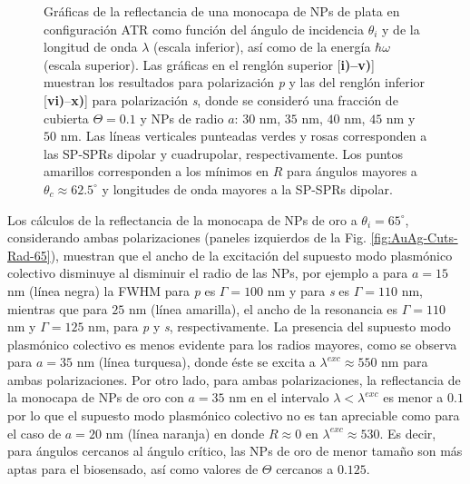\begin{figure}[h!]
\vspace*{-.5em}
	\caption{Gráficas de la reflectancia de una monocapa de NPs de plata en configuración ATR como función del ángulo de incidencia $\theta_i$ y de la longitud de onda $\lambda$ (escala inferior), así como de la energía  $\hbar\omega$ (escala superior).  Las gráficas   en el renglón superior [\textbf{i)--v)}] muestran los resultados para  polarización \emph{p} y las del renglón inferior  [\textbf{vi)}--\textbf{x)}]  para polarización  \emph{s}, donde se consideró una fracción de cubierta $\Theta = 0.1$ y  NPs de radio  $a$: $30$ nm, $35$ nm, $40$ nm, $45$ nm y $50$ nm.  Las líneas verticales punteadas verdes y rosas corresponden a las SP-SPRs dipolar y  cuadrupolar, respectivamente.  Los puntos amarillos corresponden a los mínimos en $R$ para ángulos mayores a $\theta_c\approx 62.5^\circ$ y longitudes de onda mayores a la SP-SPRs dipolar.
}	\label{fig:Ag-R-Rad}	
	\end{figure}	

Los cálculos de la reflectancia de la monocapa de NPs de oro a $\theta_i=65^\circ$, considerando ambas polarizaciones (paneles izquierdos de la Fig. \ref{fig:AuAg-Cuts-Rad-65}), muestran que el ancho de la excitación del supuesto modo plasmónico colectivo disminuye  al disminuir el radio de las NPs, por ejemplo a para $a=15$ nm (línea negra) la FWHM para \emph{p} es $\Gamma=100$ nm y para \emph{s} es $\Gamma=110$ nm, mientras que para $25$ nm (línea amarilla), el ancho de la resonancia es $\Gamma=110$ nm y $\Gamma=125$  nm, para \emph{p} y \emph{s}, respectivamente. La presencia del supuesto modo plasmónico colectivo es menos evidente para los radios mayores, como se observa para $a=35$ nm (línea turquesa), donde éste se excita a $\lambda^{exc}\approx 550$ nm para ambas polarizaciones. Por otro lado, para ambas polarizaciones, la reflectancia de la monocapa de NPs de oro con $a=35$ nm en el intervalo  $\lambda<\lambda^{exc}$  es menor a $0.1$ por lo que el supuesto modo plasmónico colectivo no es tan apreciable como para el caso de $a=20$ nm (línea naranja) en donde $R\approx 0$ en $\lambda^{exc}\approx 530$. Es decir, para ángulos cercanos al ángulo crítico, las NPs de oro de menor tamaño son más aptas para el biosensado, así como valores de $\Theta$ cercanos a $0.125$.

